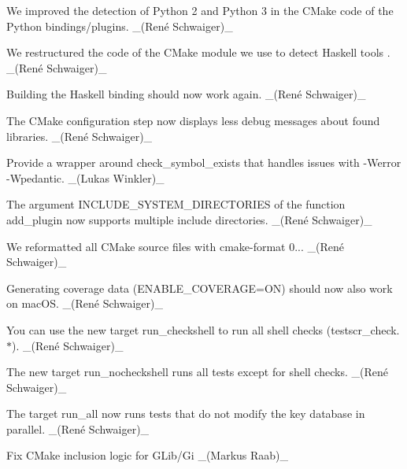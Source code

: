 \begin{DoxyItemize}
\item We improved the detection of Python 2 and Python 3 in the C\+Make code of the Python bindings/plugins. \+\_\+(René Schwaiger)\+\_\+
\item We restructured the code of the C\+Make module we use to detect Haskell tools . \+\_\+(René Schwaiger)\+\_\+
\item Building the Haskell binding should now work again. \+\_\+(René Schwaiger)\+\_\+
\item The C\+Make configuration step now displays less debug messages about found libraries. \+\_\+(René Schwaiger)\+\_\+
\item Provide a wrapper around {\ttfamily check\+\_\+symbol\+\_\+exists} that handles issues with {\ttfamily -\/\+Werror -\/\+Wpedantic}. \+\_\+(\+Lukas Winkler)\+\_\+
\item The argument {\ttfamily I\+N\+C\+L\+U\+D\+E\+\_\+\+S\+Y\+S\+T\+E\+M\+\_\+\+D\+I\+R\+E\+C\+T\+O\+R\+I\+ES} of the function {\ttfamily add\+\_\+plugin} now supports multiple include directories. \+\_\+(René Schwaiger)\+\_\+
\item We reformatted all C\+Make source files with cmake-\/format 0... \+\_\+(René Schwaiger)\+\_\+
\item Generating coverage data ({\ttfamily E\+N\+A\+B\+L\+E\+\_\+\+C\+O\+V\+E\+R\+A\+GE=ON}) should now also work on mac\+OS. \+\_\+(René Schwaiger)\+\_\+
\item You can use the new target {\ttfamily run\+\_\+checkshell} to run all shell checks ({\ttfamily testscr\+\_\+check.$\ast$}). \+\_\+(René Schwaiger)\+\_\+
\item The new target {\ttfamily run\+\_\+nocheckshell} runs all tests except for shell checks. \+\_\+(René Schwaiger)\+\_\+
\item The target {\ttfamily run\+\_\+all} now runs tests that do not modify the key database in parallel. \+\_\+(René Schwaiger)\+\_\+
\item Fix C\+Make inclusion logic for G\+Lib/\+Gi \+\_\+(\+Markus Raab)\+\_\+
\end{DoxyItemize}


